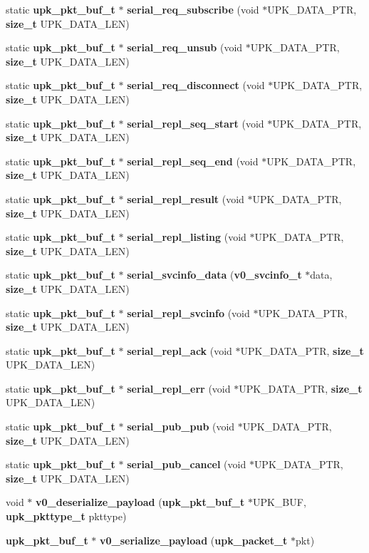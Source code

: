 \begin{DoxyCompactItemize}
\item 
static {\bf upk\_\-pkt\_\-buf\_\-t} $\ast$ {\bf serial\_\-req\_\-subscribe} (void $\ast$UPK\_\-DATA\_\-PTR, {\bf size\_\-t} UPK\_\-DATA\_\-LEN)
\item 
static {\bf upk\_\-pkt\_\-buf\_\-t} $\ast$ {\bf serial\_\-req\_\-unsub} (void $\ast$UPK\_\-DATA\_\-PTR, {\bf size\_\-t} UPK\_\-DATA\_\-LEN)
\item 
static {\bf upk\_\-pkt\_\-buf\_\-t} $\ast$ {\bf serial\_\-req\_\-disconnect} (void $\ast$UPK\_\-DATA\_\-PTR, {\bf size\_\-t} UPK\_\-DATA\_\-LEN)
\item 
static {\bf upk\_\-pkt\_\-buf\_\-t} $\ast$ {\bf serial\_\-repl\_\-seq\_\-start} (void $\ast$UPK\_\-DATA\_\-PTR, {\bf size\_\-t} UPK\_\-DATA\_\-LEN)
\item 
static {\bf upk\_\-pkt\_\-buf\_\-t} $\ast$ {\bf serial\_\-repl\_\-seq\_\-end} (void $\ast$UPK\_\-DATA\_\-PTR, {\bf size\_\-t} UPK\_\-DATA\_\-LEN)
\item 
static {\bf upk\_\-pkt\_\-buf\_\-t} $\ast$ {\bf serial\_\-repl\_\-result} (void $\ast$UPK\_\-DATA\_\-PTR, {\bf size\_\-t} UPK\_\-DATA\_\-LEN)
\item 
static {\bf upk\_\-pkt\_\-buf\_\-t} $\ast$ {\bf serial\_\-repl\_\-listing} (void $\ast$UPK\_\-DATA\_\-PTR, {\bf size\_\-t} UPK\_\-DATA\_\-LEN)
\item 
static {\bf upk\_\-pkt\_\-buf\_\-t} $\ast$ {\bf serial\_\-svcinfo\_\-data} ({\bf v0\_\-svcinfo\_\-t} $\ast$data, {\bf size\_\-t} UPK\_\-DATA\_\-LEN)
\item 
static {\bf upk\_\-pkt\_\-buf\_\-t} $\ast$ {\bf serial\_\-repl\_\-svcinfo} (void $\ast$UPK\_\-DATA\_\-PTR, {\bf size\_\-t} UPK\_\-DATA\_\-LEN)
\item 
static {\bf upk\_\-pkt\_\-buf\_\-t} $\ast$ {\bf serial\_\-repl\_\-ack} (void $\ast$UPK\_\-DATA\_\-PTR, {\bf size\_\-t} UPK\_\-DATA\_\-LEN)
\item 
static {\bf upk\_\-pkt\_\-buf\_\-t} $\ast$ {\bf serial\_\-repl\_\-err} (void $\ast$UPK\_\-DATA\_\-PTR, {\bf size\_\-t} UPK\_\-DATA\_\-LEN)
\item 
static {\bf upk\_\-pkt\_\-buf\_\-t} $\ast$ {\bf serial\_\-pub\_\-pub} (void $\ast$UPK\_\-DATA\_\-PTR, {\bf size\_\-t} UPK\_\-DATA\_\-LEN)
\item 
static {\bf upk\_\-pkt\_\-buf\_\-t} $\ast$ {\bf serial\_\-pub\_\-cancel} (void $\ast$UPK\_\-DATA\_\-PTR, {\bf size\_\-t} UPK\_\-DATA\_\-LEN)
\item 
void $\ast$ {\bf v0\_\-deserialize\_\-payload} ({\bf upk\_\-pkt\_\-buf\_\-t} $\ast$UPK\_\-BUF, {\bf upk\_\-pkttype\_\-t} pkttype)
\item 
{\bf upk\_\-pkt\_\-buf\_\-t} $\ast$ {\bf v0\_\-serialize\_\-payload} ({\bf upk\_\-packet\_\-t} $\ast$pkt)
\end{DoxyCompactItemize}
